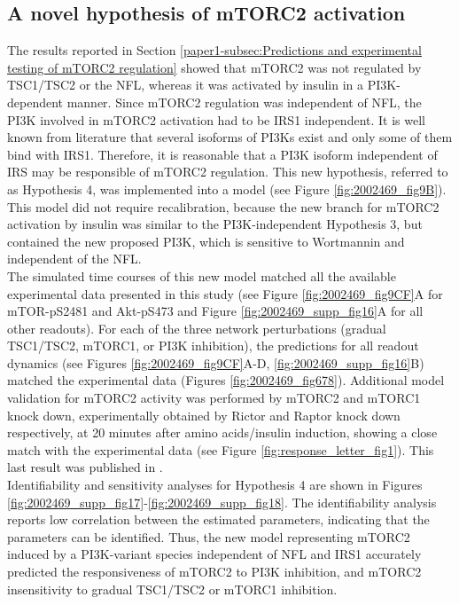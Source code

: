 \subsection{A novel hypothesis of mTORC2 activation}
\label{paper1-subsec:A novel hypothesis of mTORC2 activation}
The results reported in Section \ref{paper1-subsec:Predictions and experimental testing of mTORC2 regulation} showed that mTORC2 was not regulated by TSC1/TSC2 or the NFL, whereas it was activated by insulin in a PI3K-dependent manner. Since mTORC2 regulation was independent of NFL, the PI3K involved in mTORC2 activation had to be IRS1 independent. It is well known from literature that several isoforms of PI3Ks exist and only some of them bind with IRS1. Therefore, it is reasonable that a PI3K isoform independent of IRS may be responsible of mTORC2 regulation. This new hypothesis, referred to as Hypothesis 4, was implemented into a model (see Figure \ref{fig:2002469_fig9B}). This model did not require recalibration, because the new branch for mTORC2 activation by insulin was similar to the PI3K-independent Hypothesis 3, but contained the new proposed PI3K, which is sensitive to Wortmannin and independent of the NFL.\\
The simulated time courses of this new model matched all the available experimental data presented in this study (see Figure \ref{fig:2002469_fig9CF}A for mTOR-pS2481 and Akt-pS473 and Figure \ref{fig:2002469_supp_fig16}A for all other readouts). For each of the three network perturbations (gradual TSC1/TSC2, mTORC1, or PI3K inhibition), the predictions for all readout dynamics (see Figures \ref{fig:2002469_fig9CF}A-D, \ref{fig:2002469_supp_fig16}B) matched the experimental data (Figures \ref{fig:2002469_fig678}). Additional model validation for mTORC2 activity was performed by mTORC2 and mTORC1 knock down, experimentally obtained by Rictor and Raptor knock down respectively, at 20 minutes after amino acids/insulin induction, showing a close match with the experimental data (see Figure \ref{fig:response_letter_fig1}). This last result was published in \citep{DallePezze2012b}.\\
Identifiability and sensitivity analyses for Hypothesis 4 are shown in Figures \ref{fig:2002469_supp_fig17}-\ref{fig:2002469_supp_fig18}. The identifiability analysis reports low correlation between the estimated parameters, indicating that the parameters can be identified. Thus, the new model representing mTORC2 induced by a PI3K-variant species independent of NFL and IRS1 accurately predicted the responsiveness of mTORC2 to PI3K inhibition, and mTORC2 insensitivity to gradual TSC1/TSC2 or mTORC1 inhibition. 


